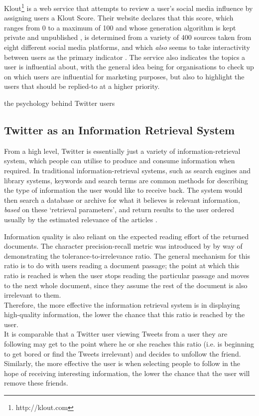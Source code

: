 Klout\footnote{http://klout.com} is a web service that attempts to review a user's social media influence by assigning users a Klout Score. Their website declares that this score, which ranges from 0 to a maximum of 100 and whose generation algorithm is kept private and unpublished \cite{edwards13}, is determined from a variety of 400 sources taken from eight different social media platforms, and which \textit{also} seems to take interactivity between users as the primary indicator \cite{anger11}. The service also indicates the topics a user is influential about, with the general idea being for organisations to check up on which users are influential for marketing purposes, but also to highlight the users that should be replied-to at a higher priority.



the psychology behind Twitter users \cite{zhao09} \cite{cha10}


\subsection{Twitter as an Information Retrieval System}
From a high level, Twitter is essentially just a variety of information-retrieval system, which people can utilise to produce and consume information when required. In traditional information-retrieval systems, such as search engines and library systems, keywords and search terms are common methods for describing the type of information the user would like to receive back. The system would then search a database or archive for what it believes is relevant information, \textit{based} on these `retrieval parameters', and return results to the user ordered usually by the estimated relevance of the articles \cite{arvola10}.

Information quality is also reliant on the expected reading effort of the returned documents. The character precision-recall metric was introduced by \cite{arvola10} by way of demonstrating the tolerance-to-irrelevance ratio. The general mechanism for this ratio is to do with users reading a document passage; the point at which this ratio is reached is when the user stops reading the particular passage and moves to the next whole document, since they assume the rest of the document is also irrelevant to them.\\
Therefore, the more effective the information retrieval system is in displaying high-quality information, the lower the chance that this ratio is reached by the user.\\ 
It is comparable that a Twitter user viewing Tweets from a user they are following may get to the point where he or she reaches this ratio (i.e. is beginning to get bored or find the Tweets irrelevant) and decides to unfollow the friend. Similarly, the more effective the user is when selecting people to follow in the hope of receiving interesting information, the lower the chance that the user will remove these friends.

